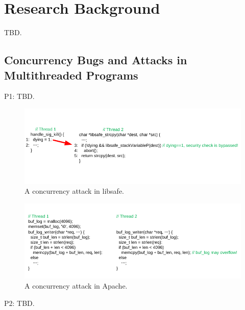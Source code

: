 
\section{Research Background} \label{sec:related}

TBD.

\subsection{Concurrency Bugs and Attacks in Multithreaded Programs} \label{sec:others-work}

P1: TBD.

\begin{figure}[t]
\centering
\includegraphics[width=0.99\columnwidth]{figures/libsafe}
\vspace{-.05in}
\caption{{A concurrency attack in libsafe.}} \label{fig:libsafe}
\vspace{-.05in}
\end{figure}

\begin{figure}[t]
\centering
\includegraphics[width=0.99\columnwidth]{figures/apache}
\vspace{-.05in}
\caption{{A concurrency attack in Apache.}} \label{fig:apache}
\vspace{-.05in}
\end{figure}

P2: TBD.

